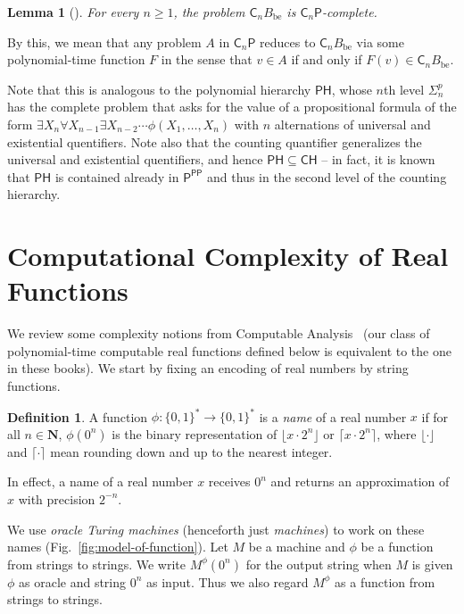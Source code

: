 \documentclass[12pt,a4paper]{article}
\newtheorem{lemma}[theorem]{Lemma}
\theoremstyle{definition}
\newtheorem{definition}[theorem]{Definition}
\theoremstyle{remark}
\newcommand{\N}{\mathbf N}
\newcommand{\classP}{\mathsf{P}}
\newcommand{\classPH}{\mathsf{PH}}
\newcommand{\classPP}{\mathsf{PP}}
\newcommand{\classCH}{\mathsf{CH}}
\newcommand{\classSigma}{\mathsf{\Sigma}}
\newcommand{\quantC}{\mathsf{C}}
\begin{document}
\begin{lemma}[{\cite[Theorem 7]{wagner1986complexity}}] \label{lemma:CnP-complete}
 For every $n \ge 1$, 
 the problem $\quantC_n B_{\mathrm{be}}$ is $\quantC_n\classP$-complete.
\end{lemma}

By this, we mean that 
any problem $A$ in $\quantC_n \classP$ reduces to $\quantC_n B_{\mathrm{be}}$ 
via some polynomial-time function $F$ 
in the sense that $v \in A$ if and only if $F (v) \in \quantC_n B_{\mathrm{be}}$. 

Note that this is analogous to the polynomial hierarchy $\classPH$, 
whose $n$th level $\classSigma ^p _n$ has the complete problem
that asks for the value of a propositional formula of the form $
\exists X _n \forall X _{n - 1} \exists X _{n - 2} \cdots \phi (X_1, \dots, X_n)
$ with $n$ alternations of universal and existential quentifiers. 
Note also that the counting quantifier generalizes 
the universal and existential quentifiers, and hence $\classPH \subseteq \classCH$ -- 
in fact, it is known~\cite{toda} that 
$\classPH$ is contained already in $\classP ^{\classPP}$
and thus in the second level of the counting hierarchy. 

\section{Computational Complexity of Real Functions}
\label{section: preliminaries}

We review some complexity notions 
from Computable Analysis~%
\cite{ko1991complexity,weihrauch00:_comput_analy}
(our class of polynomial-time computable real functions defined below
is equivalent to the one in these books). 
We start by fixing an encoding of real numbers 
by string functions.

\begin{definition}
 A function $\phi \colon \{0, 1\} ^* \to \{0, 1\}^*$ is a \emph{name} of a real number $x$ 
 if for all $n \in \N$,
 $\phi(0^n)$ is the binary representation of $\lfloor x \cdot 2^n \rfloor$ or
 $\lceil x \cdot 2^n \rceil$,
 where $\lfloor \cdot \rfloor$ and $\lceil \cdot \rceil$ mean
 rounding down and up to the nearest integer.
 \end{definition}

In effect, a name of a real number $x$ receives $0 ^n$ and 
returns an approximation of $x$ with precision $2 ^{-n}$.

We use \emph{oracle Turing machines} (henceforth just \emph{machines})
to work on these names (Fig.~\ref{fig:model-of-function}).
Let $M$ be a machine and $\phi$ be a function from strings to strings. 
We write $M ^\phi (0 ^n)$ for the output string 
when $M$ is given
$\phi$ as oracle and string $0^n$ as input.
Thus we also regard $M^\phi$ as a function from strings to strings.
\end{document}

